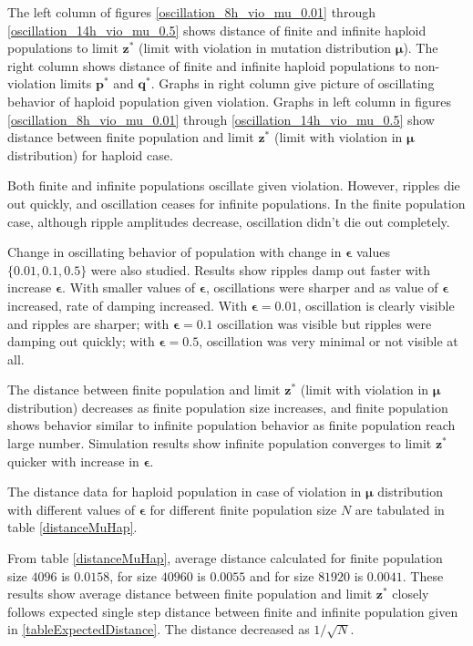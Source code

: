 
The left column of figures \ref{oscillation_8h_vio_mu_0.01} through \ref{oscillation_14h_vio_mu_0.5} 
shows distance of finite and infinite haploid populations to limit $\bm{z^\ast}$ (limit with violation in mutation distribution $\bm{\mu}$). The 
right column shows distance of finite and infinite haploid populations to non-violation limits $\bm{p^\ast}$ and $\bm{q^\ast}$. 
Graphs in right column give picture of oscillating behavior of haploid population given violation. 
Graphs in left column in figures \ref{oscillation_8h_vio_mu_0.01} through \ref{oscillation_14h_vio_mu_0.5} show distance 
between finite population and limit $\bm{z}^\ast$ (limit with violation in $\bm{\mu}$ distribution) for haploid case.

Both finite and infinite populations oscillate given violation. However, ripples die out quickly, 
and oscillation ceases for infinite populations.
In the finite population case, although ripple amplitudes decrease, oscillation didn't die out completely. 

Change in oscillating behavior of population with change in $\bm{\epsilon}$ values $\{0.01, 0.1, 0.5\}$ were also studied. 
Results show ripples damp out faster with increase $\bm{\epsilon}$.
With smaller values of $\bm{\epsilon}$, oscillations were sharper and as value of $\bm{\epsilon}$ increased, 
rate of damping increased. With $\bm{\epsilon} = 0.01$, oscillation is clearly visible and ripples are sharper; with $\bm{\epsilon} = 0.1$ oscillation was visible 
but ripples were damping out quickly;  with $\bm{\epsilon} = 0.5$, oscillation was very minimal or not visible at all. 

The distance between finite population and limit $\bm{z}^\ast$ (limit with violation in $\bm{\mu}$ distribution) 
decreases as finite population size increases, 
and finite population shows behavior similar to infinite population behavior as finite population reach large number. 
Simulation results show infinite population converges 
to limit $\bm{z^\ast}$ quicker with increase in $\bm{\epsilon}$. 

The distance data for haploid population in case of violation in $\bm{\mu}$ distribution 
with different values of $\bm{\epsilon}$ for different finite population size $N$ are tabulated in table \ref{distanceMuHap}.

From table \ref{distanceMuHap}, average distance calculated for finite population size $4096$ is $0.0158$, 
for size $40960$ is $0.0055$ and for size $81920$ is $0.0041$. These results show average distance 
between finite population and limit $\bm{z^\ast}$ closely follows expected single step distance 
between finite and infinite population given in \ref{tableExpectedDistance}. The distance decreased as $1/\sqrt{N}$.

